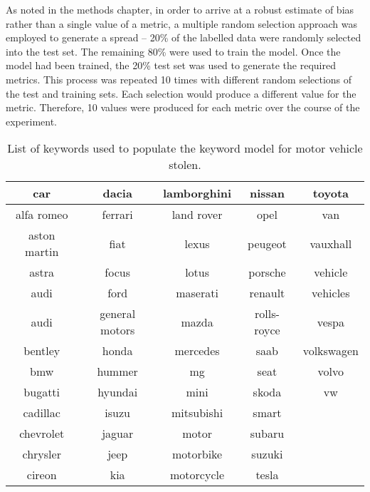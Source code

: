 As noted in the methods chapter, in order to arrive at a robust estimate of bias rather than a single value of a metric, a multiple random selection approach was employed to generate a spread – 20\% of the labelled data were randomly selected into the test set. The remaining 80\% were used to train the model. Once the model had been trained, the 20\% test set was used to generate the required metrics. This process was repeated 10 times with different random selections of the test and training sets. Each selection would produce a different value for the metric. Therefore, 10 values were produced for each metric over the course of the experiment.



\begin{table}[]
\begin{tabular}{|c|c|c|c|c|}
\hline
car          & dacia          & lamborghini & nissan      & toyota     \\ \hline
alfa romeo   & ferrari        & land rover  & opel        & van        \\ \hline
aston martin & fiat           & lexus       & peugeot     & vauxhall   \\ \hline
astra        & focus          & lotus       & porsche     &  vehicle  \\ \hline
audi         & ford           & maserati    & renault     &  vehicles    \\ \hline
audi         & general motors & mazda       & rolls-royce & vespa  \\ \hline
bentley      & honda          & mercedes    & saab        & volkswagen      \\ \hline
bmw          & hummer         & mg          & seat        & volvo   \\ \hline
bugatti      & hyundai        & mini        & skoda       & vw       \\ \hline
cadillac     & isuzu          & mitsubishi  & smart       &       \\ \hline
chevrolet    & jaguar         & motor       & subaru      &            \\ \hline
chrysler     & jeep           & motorbike   & suzuki      &            \\ \hline
cireon       & kia            & motorcycle  & tesla       &            \\ \hline
\end{tabular}
\caption[Keywords for keyword model - motor vehicle stolen]{\label{tab:Keywords} List of keywords used to populate the  keyword model for motor vehicle stolen.}
\end{table}


